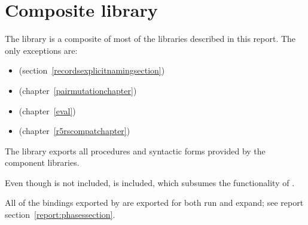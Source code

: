 \chapter{Composite library}
\label{complibchapter}

The  library is a composite of most of the libraries
described in this report.  The only exceptions are:
%
\begin{itemize}
\item {} (section~\ref{recordsexplicitnamingsection})
\item {} (chapter~\ref{pairmutationchapter})
\item {} (chapter~\ref{eval})
\item {} (chapter~\ref{r5rscompatchapter})
\end{itemize}
%
The library exports all procedures and syntactic forms provided by the
component libraries.

\begin{note}
  Even though  is not
  included,  is included, which
  subsumes the functionality of .
\end{note}

All of the bindings exported by  are exported for both {\cf run}
and {\cf expand}; see report section~\ref{report:phasessection}.


